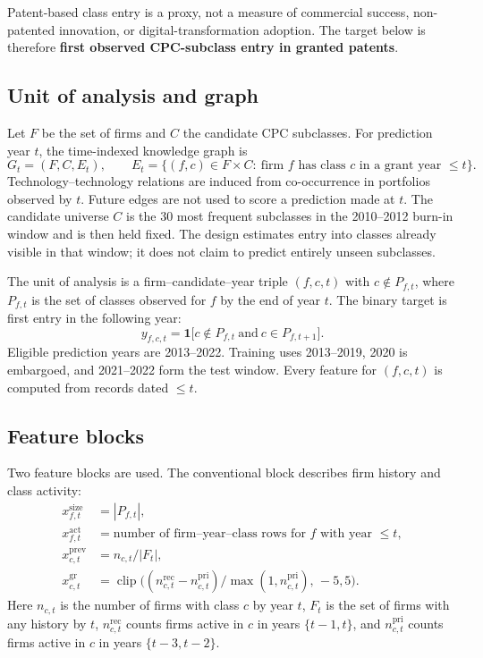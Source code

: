 \documentclass[preprint,12pt,3p]{elsarticle}
\DeclareMathOperator{\clip}{clip}
\begin{document}
Patent-based class entry is a proxy, not a measure of commercial success, non-patented innovation, or digital-transformation adoption. The target below is therefore \textbf{first observed CPC-subclass entry in granted patents}.

\subsection{Unit of analysis and graph}
Let $F$ be the set of firms and $C$ the candidate CPC subclasses. For prediction year $t$, the time-indexed knowledge graph is
\begin{equation}
G_t = (F, C, E_t),\qquad
E_t = \bigl\{(f,c)\in F\times C:\ \text{firm } f \text{ has class } c \text{ in a grant year }\le t\bigr\}.
\label{eq:graph}
\end{equation}
Technology--technology relations are induced from co-occurrence in portfolios observed by $t$. Future edges are not used to score a prediction made at $t$. The candidate universe $C$ is the 30 most frequent subclasses in the 2010--2012 burn-in window and is then held fixed. The design estimates entry into classes already visible in that window; it does not claim to predict entirely unseen subclasses.

The unit of analysis is a firm--candidate--year triple $(f,c,t)$ with $c\notin P_{f,t}$, where $P_{f,t}$ is the set of classes observed for $f$ by the end of year $t$. The binary target is first entry in the following year:
\begin{equation}
y_{f,c,t} = \mathbf{1}\bigl[c \notin P_{f,t}\ \text{and}\ c \in P_{f,t+1}\bigr].
\label{eq:target}
\end{equation}
Eligible prediction years are 2013--2022. Training uses 2013--2019, 2020 is embargoed, and 2021--2022 form the test window. Every feature for $(f,c,t)$ is computed from records dated $\le t$.

\subsection{Feature blocks}
Two feature blocks are used. The conventional block describes firm history and class activity:
\begin{align}
x^{\mathrm{size}}_{f,t} &= |P_{f,t}|,
\label{eq:size}\\
x^{\mathrm{act}}_{f,t} &= \text{number of firm--year--class rows for } f \text{ with year }\le t,
\label{eq:act}\\
x^{\mathrm{prev}}_{c,t} &= n_{c,t}/|F_t|,
\label{eq:prev}\\
x^{\mathrm{gr}}_{c,t} &= \clip\bigl((n^{\mathrm{rec}}_{c,t}-n^{\mathrm{pri}}_{c,t})/\max(1,n^{\mathrm{pri}}_{c,t}),\,-5,5\bigr).
\label{eq:gr}
\end{align}
Here $n_{c,t}$ is the number of firms with class $c$ by year $t$, $F_t$ is the set of firms with any history by $t$, $n^{\mathrm{rec}}_{c,t}$ counts firms active in $c$ in years $\{t-1,t\}$, and $n^{\mathrm{pri}}_{c,t}$ counts firms active in $c$ in years $\{t-3,t-2\}$.
\end{document}
